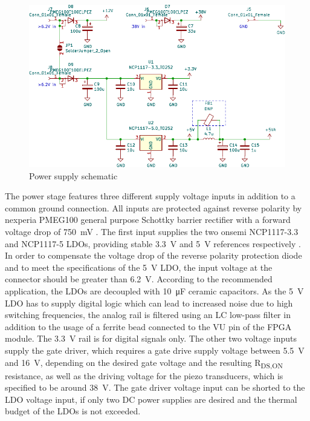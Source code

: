 \documentclass[
	english,
	ruledheaders=section, %
	class=report,%
	thesis={type=Project Seminar Report},%
	accentcolor=TUDa-1d, %
	custommargins=false,%
	marginpar=false,%
	parskip=half-,%
	fontsize=11pt,%
]{tudapub}
\begin{document}
\begin{figure}[H]
    \centering
    \includegraphics[width=0.8\columnwidth]{schematics/sch_power.pdf}
    \caption{Power supply schematic}
    \label{sch:power}
\end{figure}
The power stage features three different supply voltage inputs in addition to a common ground connection. All inputs are protected against reverse polarity by nexperia PMEG100 general purpose Schottky barrier rectifier with a forward voltage drop of \SI{750}{\milli\volt} \autocite{nexperia10010Low2020}. The first input supplies the two onsemi NCP1117-3.3 and NCP1117-5 \glspl{LDO}, providing stable \SI{3.3}{\volt} and \SI{5}{\volt} references respectively \autocite{onsemiconductorcorporationLowDropoutPositiveFixed2017}. In order to compensate the voltage drop of the reverse polarity protection diode and to meet the specifications of the \SI{5}{\volt} \gls{LDO}, the input voltage at the connector should be greater than \SI{6.2}{\volt}. According to the recommended application, the \glspl{LDO} are decoupled with \SI{10}{\micro\farad} ceramic capacitors. As the \SI{5}{\volt} \gls{LDO} has to supply digital logic which can lead to increased noise due to high switching frequencies, the analog rail is filtered using an LC low-pass filter in addition to the usage of a ferrite bead connected to the VU pin of the \gls{FPGA} module. The \SI{3.3}{\volt} rail is for digital signals only. The other two voltage inputs supply the gate driver, which requires a gate drive supply voltage between \SI{5.5}{\volt} and \SI{16}{\volt}, depending on the desired gate voltage and the resulting R\textsubscript{DS,ON} resistance, as well as the driving voltage for the piezo transducers, which is specified to be around \SI{38}{\volt}. The gate driver voltage input can be shorted to the \gls{LDO} voltage input, if only two DC power supplies are desired and the thermal budget of the \glspl{LDO} is not exceeded.
\end{document}
